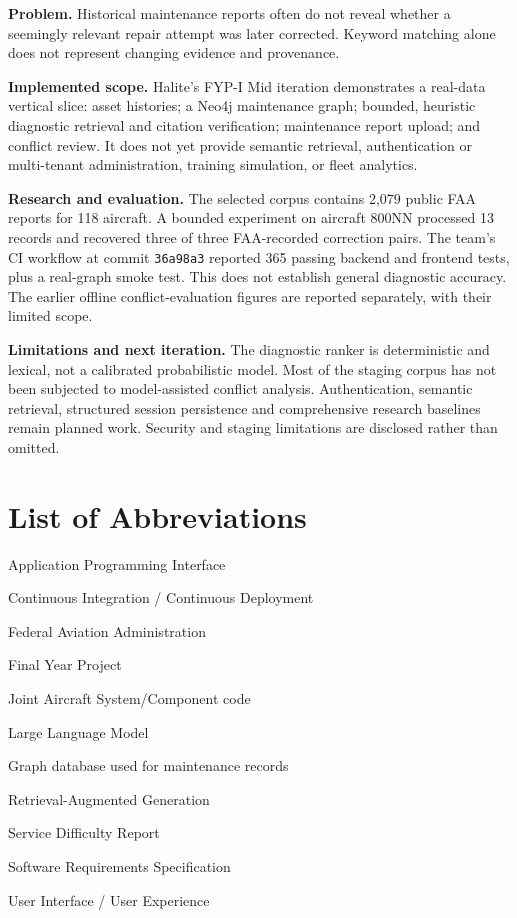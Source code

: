 \textbf{Problem.} Historical maintenance reports often do not reveal whether a seemingly relevant repair attempt was later corrected. Keyword matching alone does not represent changing evidence and provenance.

\textbf{Implemented scope.} Halite's FYP-I Mid iteration demonstrates a real-data vertical slice: asset histories; a Neo4j maintenance graph; bounded, heuristic diagnostic retrieval and citation verification; maintenance report upload; and conflict review. It does not yet provide semantic retrieval, authentication or multi-tenant administration, training simulation, or fleet analytics.

\textbf{Research and evaluation.} The selected corpus contains 2,079 public FAA reports for 118 aircraft. A bounded experiment on aircraft 800NN processed 13 records and recovered three of three FAA-recorded correction pairs. The team's CI workflow at commit \texttt{36a98a3} reported 365 passing backend and frontend tests, plus a real-graph smoke test. This does not establish general diagnostic accuracy. The earlier offline conflict-evaluation figures are reported separately, with their limited scope.

\textbf{Limitations and next iteration.} The diagnostic ranker is deterministic and lexical, not a calibrated probabilistic model. Most of the staging corpus has not been subjected to model-assisted conflict analysis. Authentication, semantic retrieval, structured session persistence and comprehensive research baselines remain planned work. Security and staging limitations are disclosed rather than omitted.

\clearpage
\chapter*{List of Abbreviations}

\begin{description}[leftmargin=5.5em,style=sameline,font=\bfseries]
\item[API] Application Programming Interface
\item[CI/CD] Continuous Integration / Continuous Deployment
\item[FAA] Federal Aviation Administration
\item[FYP] Final Year Project
\item[JASC] Joint Aircraft System/Component code
\item[LLM] Large Language Model
\item[Neo4j] Graph database used for maintenance records
\item[RAG] Retrieval-Augmented Generation
\item[SDR] Service Difficulty Report
\item[SRS] Software Requirements Specification
\item[UI/UX] User Interface / User Experience
\end{description}

\clearpage
\tableofcontents
\clearpage
\listoffigures
\clearpage
\listoftables
\clearpage

\pagestyle{fancy}
\setcounter{page}{1}
